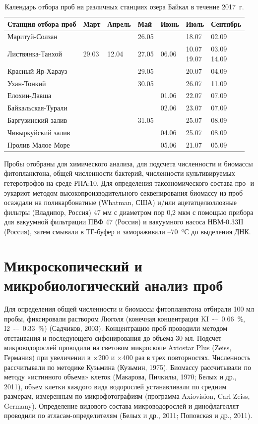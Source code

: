 \documentclass[a4paper,12pt,openany,final]{extreport}
\newcommand\theyear{2017}
\def\oldcaption{} \let\oldcaption=\caption
\def\caption{\stepcounter{captionsnum}\oldcaption}
\begin{document}
\begin{table}
\caption{Календарь отбора проб на различных станциях озера Байкал в
течение \theyear~г.}\label{table:1}
\begin{center}
{\small%
\begin{tabular}{|l|l|l|l|l|l|l|}
  \hline
\rm Станция отбора проб & Март & Апрель & Май & Июнь & Июль &
                                                          Сентябрь\tabularnewline
                                                          \hline
Маритуй-Солзан & & & 26.05 & & 18.07 & 02.09\tabularnewline
Листвянка-Танхой &
29.03 &
12.04 &
27.05 &
06.06 &
\makecell[tl]{10.07\\
19.07}&
\makecell[tl]{03.09\\
14.09}\tabularnewline
Красный Яр-Харауз  & & & 29.05 & & 20.07 & 04.09\tabularnewline
Ухан-Тонкий        & & & 30.05 & & 26.07 & 11.09\tabularnewline
Елохин-Давша       & & & & 01.06 & 22.07 & 07.09\tabularnewline
Байкальская-Турали & & & & 02.06 & 23.07 & 07.09\tabularnewline
Баргузинский  залив  & & & 31.05 & & 25.07 & 08.09\tabularnewline
Чивыркуйский залив & & & & 04.06 & 25.07 & 08.09\tabularnewline
Пролив Малое Море  & & & & 05.06 & 21.07 & 05.09\tabularnewline
\hline
\end{tabular}%
}
\end{center}
\end{table}

Пробы отобраны для химического анализа, для подсчета численности и биомассы фитопланктона, общей численности бактерий, численности культивируемых гетеротрофов на среде РПА:10. Для определения таксономического состава про- и эукариот методом высокопроизводительного секвенирования биомассу из проб осаждали на поликарбонатные (Whatman, США) и/или ацетатцелюллозные фильтры (Владипор, Россия) 47 мм с диаметром пор 0,2 мкм с помощью прибора для вакуумной фильтрации ПВФ 47 (Россия) и вакуумного насоса НВМ-0.33II (Россия), затем смывали в ТЕ-буфер и замораживали –70~ºС до выделения ДНК.

\section{Микроскопический и микробиологический анализ проб}

Для определения общей численности и биомассы фитопланктона отбирали 100 мл пробы, фиксировали раствором Люголя (конечная концентрация KI~-–~0.66~\%, I2~-–~0.33~\%) (Садчиков, 2003). Концентрацию проб проводили методом отстаивания и последующего сифонирования до объема 30 мл. Подсчет микроводорослей проводили на световом микроскопе Axiostar Plus (Zeiss, Германия) при увеличении в ×200 и ×400 раз в трех повторностях. Численность рассчитывали по методике Кузьмина (Кузьмин, 1975). Биомассу рассчитывали по методу «истинного объема» клеток (Макарова, Пичкилы, 1970; Белых и др., 2011), объем клетки каждого вида водорослей устанавливали по средним размерам, измеренным по микрофотографиям (программа Axiovision, Carl Zeiss, Germany). Определение видового состава микроводорослей и динофлагеллят проводили по атласам-определителям (Белых и др., 2011; Поповская и др., 2011).
\end{document}
